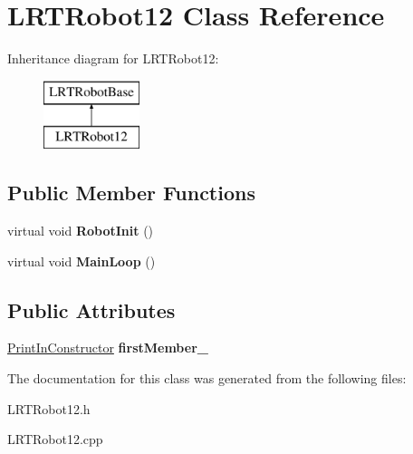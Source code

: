 \hypertarget{class_l_r_t_robot12}{\section{\-L\-R\-T\-Robot12 \-Class \-Reference}
\label{class_l_r_t_robot12}
}
\-Inheritance diagram for \-L\-R\-T\-Robot12\-:\begin{figure}[H]
\begin{center}
\leavevmode
\includegraphics[height=2.000000cm]{class_l_r_t_robot12}
\end{center}
\end{figure}
\subsection*{\-Public \-Member \-Functions}
\begin{DoxyCompactItemize}
\item 
\hypertarget{class_l_r_t_robot12_a39758ff301b0112b74cefa7b10b11cbb}{virtual void {\bfseries \-Robot\-Init} ()}\label{class_l_r_t_robot12_a39758ff301b0112b74cefa7b10b11cbb}

\item 
\hypertarget{class_l_r_t_robot12_a43c496f6794d0d790857aea01e77791e}{virtual void {\bfseries \-Main\-Loop} ()}\label{class_l_r_t_robot12_a43c496f6794d0d790857aea01e77791e}

\end{DoxyCompactItemize}
\subsection*{\-Public \-Attributes}
\begin{DoxyCompactItemize}
\item 
\hypertarget{class_l_r_t_robot12_a6cc4a4daa8750d97f8f0da24361578a1}{\hyperlink{class_print_in_constructor}{\-Print\-In\-Constructor} {\bfseries first\-Member\-\_\-}}\label{class_l_r_t_robot12_a6cc4a4daa8750d97f8f0da24361578a1}

\end{DoxyCompactItemize}


\-The documentation for this class was generated from the following files\-:\begin{DoxyCompactItemize}
\item 
\-L\-R\-T\-Robot12.\-h\item 
\-L\-R\-T\-Robot12.\-cpp\end{DoxyCompactItemize}
